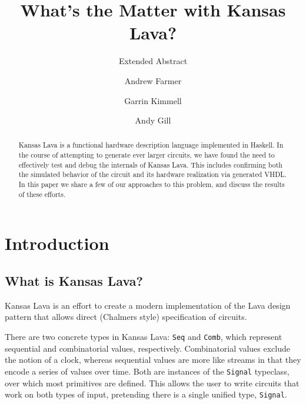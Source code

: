 \documentclass{llncs}
\begin{document}
\title{What's the Matter with Kansas Lava?}
\subtitle{Extended Abstract}

\author{Andrew Farmer \and Garrin Kimmell \and Andy Gill}


\maketitle

\begin{abstract}
Kansas Lava is a functional hardware description language implemented
in Haskell. In the course of attempting to generate ever larger circuits,
we have found the need to effectively test and debug the internals of
Kansas Lava. This includes confirming both the simulated behavior of the
circuit and its hardware realization via generated VHDL. In
this paper we share a few of our approaches to this problem, and discuss
the results of these efforts.
\end{abstract}

\section{Introduction}

\subsection{What is Kansas Lava?}

Kansas Lava is an effort to create a modern implementation of the Lava
design pattern that allows direct (Chalmers style) specification of circuits.

There are two concrete types in Kansas Lava: \verb!Seq! and \verb!Comb!, which represent
sequential and combinatorial values, respectively. Combinatorial values exclude the
notion of a clock, whereas sequential values are more like streams in that they
encode a series of values over time. Both are instances of the \verb!Signal! typeclass,
over which most primitives are defined.
This allows the user to write circuits that work on both types of input, pretending
there is a single unified type, \verb!Signal!.
\end{document}
